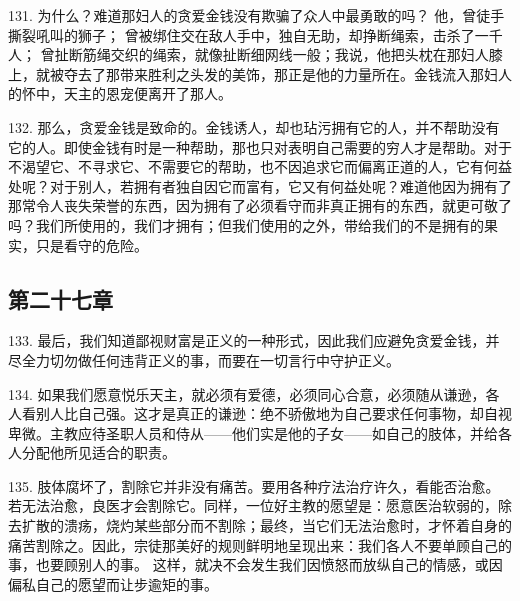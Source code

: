 131. 为什么？难道那妇人的贪爱金钱没有欺骗了众人中最勇敢的吗？ 他，曾徒手撕裂吼叫的狮子； 曾被绑住交在敌人手中，独自无助，却挣断绳索，击杀了一千人； 曾扯断筋绳交织的绳索，就像扯断细网线一般；我说，他把头枕在那妇人膝上，就被夺去了那带来胜利之头发的美饰，那正是他的力量所在。金钱流入那妇人的怀中，天主的恩宠便离开了那人。\par

132. 那么，贪爱金钱是致命的。金钱诱人，却也玷污拥有它的人，并不帮助没有它的人。即使金钱有时是一种帮助，那也只对表明自己需要的穷人才是帮助。对于不渴望它、不寻求它、不需要它的帮助，也不因追求它而偏离正道的人，它有何益处呢？对于别人，若拥有者独自因它而富有，它又有何益处呢？难道他因为拥有了那常令人丧失荣誉的东西，因为拥有了必须看守而非真正拥有的东西，就更可敬了吗？我们所使用的，我们才拥有；但我们使用的之外，带给我们的不是拥有的果实，只是看守的危险。\par


\subsection{第二十七章}

\par

133. 最后，我们知道鄙视财富是正义的一种形式，因此我们应避免贪爱金钱，并尽全力切勿做任何违背正义的事，而要在一切言行中守护正义。\par

134. 如果我们愿意悦乐天主，就必须有爱德，必须同心合意，必须随从谦逊，各人看别人比自己强。这才是真正的谦逊：绝不骄傲地为自己要求任何事物，却自视卑微。主教应待圣职人员和侍从——他们实是他的子女——如自己的肢体，并给各人分配他所见适合的职责。\par

135. 肢体腐坏了，割除它并非没有痛苦。要用各种疗法治疗许久，看能否治愈。若无法治愈，良医才会割除它。同样，一位好主教的愿望是：愿意医治软弱的，除去扩散的溃疡，烧灼某些部分而不割除；最终，当它们无法治愈时，才怀着自身的痛苦割除之。因此，宗徒那美好的规则鲜明地呈现出来：我们各人不要单顾自己的事，也要顾别人的事。 这样，就决不会发生我们因愤怒而放纵自己的情感，或因偏私自己的愿望而让步逾矩的事。\par

